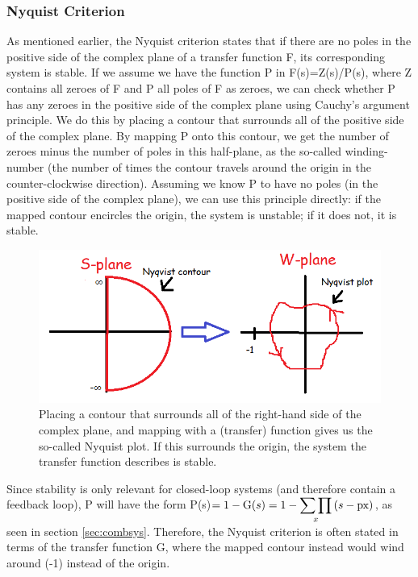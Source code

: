 \subsubsection{Nyquist Criterion}
As mentioned earlier, the Nyquist criterion states that if there are no poles in the positive side of the complex plane of a transfer function F, its corresponding system is stable. If we assume we have the function P in F(s)=Z(s)/P(s), where Z contains all zeroes of F and P all poles of F as zeroes, we can check whether P has any zeroes in the positive side of the complex plane using Cauchy's argument principle. We do this by placing a contour that surrounds all of the positive side of the complex plane. By mapping P onto this contour, we get the number of zeroes minus the number of poles in this half-plane, as the so-called winding-number (the number of times the contour travels around the origin in the counter-clockwise direction). Assuming we know P to have no poles (in the positive side of the complex plane), we can use this principle directly: if the mapped contour encircles the origin, the system is unstable; if it does not, it is stable.

\begin{figure}[h!]
    \centering
    \includegraphics[scale= 0.4]{Images/nykv.PNG}
    \caption{Placing a contour that surrounds all of the right-hand side of the complex plane, and mapping with a (transfer) function gives us the so-called Nyquist plot. If this surrounds the origin, the system the transfer function describes is stable.}
    \label{Nyqvist}
\end{figure}

Since stability is only relevant for closed-loop systems (and therefore contain a feedback loop), P will have the form P(s)$=1-\text{G}(s)=1-\smashoperator{\sumprod_{x}}{(s-\text{px})}$, as seen in section \ref{sec:combsys}. Therefore, the Nyquist criterion is often stated in terms of the transfer function G, where the mapped contour instead would wind around (-1) instead of the origin.

